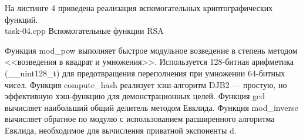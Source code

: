 На листинге 4 приведена реализация вспомогательных криптографических функций.\\
    {task-04.cpp}
    {}
    {Вспомогательные функции RSA}

Функция mod\_pow выполняет быстрое модульное возведение в степень методом <<возведения в квадрат и умножения>>. Используется 128-битная арифметика (\_\_uint128\_t) для предотвращения переполнения при умножении 64-битных чисел. Функция compute\_hash реализует хэш-алгоритм DJB2 — простую, но эффективную хэш-функцию для демонстрационных целей. Функция gcd вычисляет наибольший общий делитель методом Евклида. Функция mod\_inverse вычисляет обратное по модулю с использованием расширенного алгоритма Евклида, необходимое для вычисления приватной экспоненты d.
